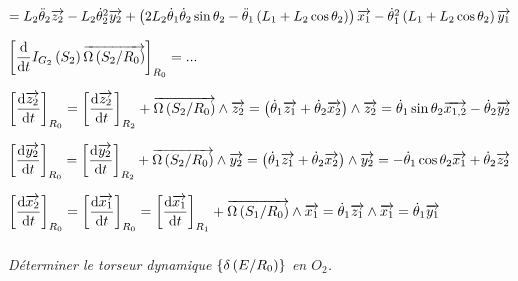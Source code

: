 \documentclass[10pt,fleqn]{article} %
\begin{document}
\begin{multicols}{2}
\begin{corrige}
$=L_2 \ddot{\theta}_2 \vect{z_2}-L_2 \dot{\theta}_2^2 \vect{y_2} 
+\left(2L_2 \dot{\theta}_1 \dot{\theta}_2 \sin\theta_2 %
-\ddot{\theta}_1\left (L_1+L_2 \cos\theta_2 \right)\right)\vect{x_1}
-\dot{\theta}_1^2\left (L_1+L_2 \cos\theta_2 \right)\vect{y_1}$


$\left[\dfrac{\text{d}}{\text{d} t}I_{G_2}\left( S_2\right)\overrightarrow{\Omega\left( {S_2}/{R_0}\right)}\right]_{R_0}=...
$

$\left[\dfrac{\text{d} \overrightarrow{z_2}}{\text{d} t}\right]_{R_0}
=\left[\dfrac{\text{d} \overrightarrow{z_2}}{\text{d} t}\right]_{R_2} + \overrightarrow{\Omega\left( {S_2}/{R_0}\right)}\wedge\overrightarrow{z_2}
= \left( \dot{\theta}_1 \overrightarrow{z_1}+\dot{\theta}_2 \overrightarrow{x_2}\right) \wedge \overrightarrow{z_2}
= \dot{\theta}_1 \sin\theta_2 \overrightarrow{x_{1,2}} -\dot{\theta}_2 \overrightarrow{y_2} 
$


$\left[\dfrac{\text{d} \overrightarrow{y_2}}{\text{d} t}\right]_{R_0}
=\left[\dfrac{\text{d} \overrightarrow{y_2}}{\text{d} t}\right]_{R_2} + \overrightarrow{\Omega\left( {S_2}/{R_0}\right)}\wedge\overrightarrow{y_2}
= \left( \dot{\theta}_1 \overrightarrow{z_1}+\dot{\theta}_2 \overrightarrow{x_2}\right) \wedge \overrightarrow{y_2}
= -\dot{\theta}_1 \cos\theta_2\overrightarrow{x_1}+\dot{\theta}_2 \overrightarrow{z_2}
$


$\left[\dfrac{\text{d} \overrightarrow{x_2}}{\text{d} t}\right]_{R_0}
=\left[\dfrac{\text{d} \overrightarrow{x_1}}{\text{d} t}\right]_{R_0}
=\left[\dfrac{\text{d} \overrightarrow{x_1}}{\text{d} t}\right]_{R_1} + \overrightarrow{\Omega\left( {S_1}/{R_0}\right)}\wedge\overrightarrow{x_1}
=\dot{\theta}_1 \overrightarrow{z_1} \wedge  \overrightarrow{x_1}
=\dot{\theta}_1 \overrightarrow{y_1}$




\end{corrige}
\else
\fi

\subparagraph{}\textit{Déterminer le torseur dynamique  $\left\{\delta \left(E/R_0 \right) \right\}$ en $O_2$.}


\end{multicols}
\end{document}

